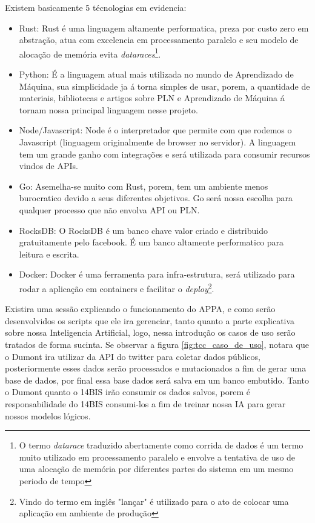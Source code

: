 Existem basicamente 5 técnologias em evidencia:
\begin{itemize}
 \item Rust: Rust é uma linguagem altamente performatica, preza por custo zero em abstração, atua com excelencia em processamento paralelo e seu modelo de alocação de memória evita \textit{dataraces}\footnote{O termo \textit{datarace} traduzido abertamente como corrida de dados é um termo muito utilizado em processamento paralelo e envolve a tentativa de uso de uma alocação de memória por diferentes partes do sistema em um mesmo periodo de tempo}.
 \item Python: É a linguagem atual mais utilizada no mundo de Aprendizado de Máquina, sua simplicidade ja á torna simples de usar, porem, a quantidade de materiais, bibliotecas e artigos sobre PLN e Aprendizado de Máquina á tornam nossa principal linguagem nesse projeto.
 \item Node/Javascript: Node é o interpretador que permite com que rodemos o Javascript (linguagem originalmente de browser no servidor). A linguagem tem um grande ganho com integrações e será utilizada para consumir recursos vindos de APIs.
 \item Go: Asemelha-se muito com Rust, porem, tem um ambiente menos burocratico devido a seus diferentes objetivos. Go será nossa escolha para qualquer processo que não envolva API ou PLN.
 \item RocksDB: O RocksDB é um banco chave valor criado e distribuido gratuitamente pelo facebook. É um banco altamente performatico para leitura e escrita.
 \item Docker: Docker é uma ferramenta para infra-estrutura, será utilizado para rodar a aplicação em containers e facilitar o \textit{deploy}\footnote{Vindo do termo em inglês "lançar" é utilizado para o ato de colocar uma aplicação em ambiente de produção}.
\end{itemize}

Existira uma sessão explicando o funcionamento do APPA, e como serão desenvolvidos os scripts que ele ira gerenciar, tanto quanto a parte explicativa sobre nossa Inteligencia Artificial, logo, nessa introdução os casos de uso serão tratados de forma sucinta. Se observar a figura \ref{fig:tcc_caso_de_uso}, notara que o Dumont ira utilizar da API do twitter para coletar dados públicos, posteriormente esses dados serão processados e mutacionados a fim de gerar uma base de dados, por final essa base dados será salva em um banco embutido. Tanto o Dumont quanto o 14BIS irão consumir os dados salvos, porem é responsabilidade do 14BIS consumi-los a fim de treinar nossa IA para gerar nossos modelos lógicos.

